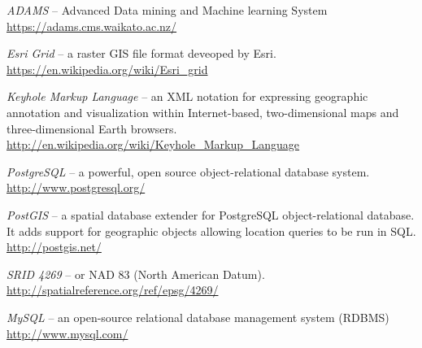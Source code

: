 %

\begin{thebibliography}{999}

		\textit{ADAMS} -- Advanced Data mining and Machine learning System \\
		\url{https://adams.cms.waikato.ac.nz/}{}

	 	\textit{Esri Grid} -- a raster GIS file format deveoped by Esri. \\
		\url{https://en.wikipedia.org/wiki/Esri\_grid}{}

	 	\textit{Keyhole Markup Language} -- an XML notation for expressing
	 	geographic annotation and visualization within Internet-based,
	 	two-dimensional maps and three-dimensional Earth browsers. \\
		\url{http://en.wikipedia.org/wiki/Keyhole\_Markup\_Language}{}

	 	\textit{PostgreSQL} -- a powerful, open source object-relational
	 	database system. \\
		\url{http://www.postgresql.org/}{}

		\textit{PostGIS} -- a spatial database extender for PostgreSQL
		object-relational database. It adds support for geographic
		objects allowing location queries to be run in SQL.  \\
		\url{http://postgis.net/}{}

	 	\textit{SRID 4269} -- or NAD 83 (North American Datum). \\
		\url{http://spatialreference.org/ref/epsg/4269/}{}

		\textit{MySQL} -- an open-source relational database management
		system (RDBMS) \\
		\url{http://www.mysql.com/}{}

\end{thebibliography}
